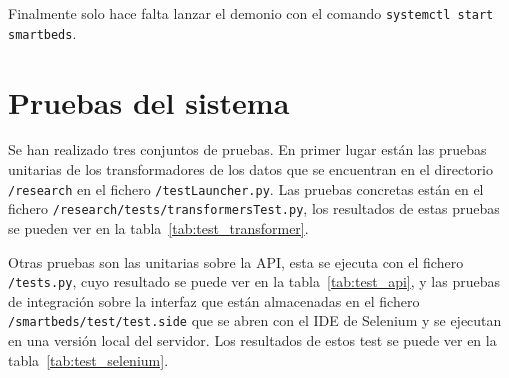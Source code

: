 Finalmente solo hace falta lanzar el demonio con el comando \texttt{systemctl start smartbeds}.

\section{Pruebas del sistema}

Se han realizado tres conjuntos de pruebas. En primer lugar están las pruebas unitarias de los transformadores de los datos que se encuentran en el directorio \texttt{/research} en el fichero \texttt{/testLauncher.py}. Las pruebas concretas están en el fichero \texttt{/research/tests/transformersTest.py}, los resultados de estas pruebas se pueden ver en la tabla~\ref{tab:test_transformer}.

Otras pruebas son las unitarias sobre la API, esta se ejecuta con el fichero \texttt{/tests.py}, cuyo resultado se puede ver en la tabla~\ref{tab:test_api}, y las pruebas de integración sobre la interfaz que están almacenadas en el fichero \texttt{/smartbeds/test/test.side} que se abren con el IDE de Selenium y se ejecutan en una versión local del servidor. Los resultados de estos test se puede ver en la tabla~\ref{tab:test_selenium}.

